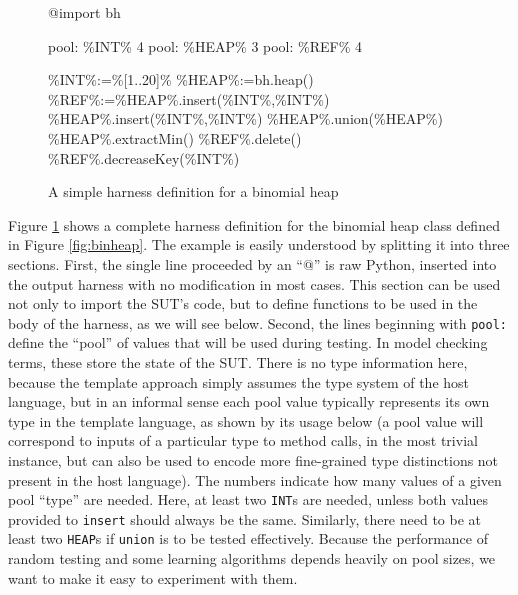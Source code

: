 \documentclass[runningheads,a4paper]{llncs}
\begin{document}
\begin{figure}[t]
{\scriptsize
\begin{code}
@import bh

pool: \%INT\% 4
pool: \%HEAP\% 3
pool: \%REF\% 4

\%INT\%:=\%[1..20]\%
\%HEAP\%:=bh.heap()
\%REF\%:=\%HEAP\%.insert(\%INT\%,\%INT\%)
\%HEAP\%.insert(\%INT\%,\%INT\%)
\%HEAP\%.union(\%HEAP\%)
\%HEAP\%.extractMin()
\%REF\%.delete()
\%REF\%.decreaseKey(\%INT\%)
\end{code}
}
\vspace{-0.1in}
\caption{A simple harness definition for a binomial heap}
\vspace{-0.1in}
\label{fig:binheapharness}
\end{figure}

Figure \ref{fig:binheapharness} shows a complete harness definition
for the binomial heap class defined in Figure \ref{fig:binheap}.  The
example is easily understood by splitting it into three sections.
First, the single line proceeded by an ``@'' is raw Python, inserted
into the output harness with no modification in most cases.  This
section can be used not only to import the SUT's code, but to define
functions to be used in the body of the harness, as we will see below.
Second, the lines beginning with {\tt pool:} define the ``pool''
\cite{Pacheco,UDITA,AndrewsTR} of values that will be used during testing.  In
model checking terms, these store the state of the SUT.  There is no
type information here, because the template approach simply assumes
the type system of the host language, but in an informal sense each
pool value typically represents its own type in the template language,
as shown by its usage below (a pool value will correspond to inputs of
a particular type to method calls, in the most trivial instance, but
can also be used to encode more fine-grained type distinctions not
present in the host language).  The numbers indicate how many values
of a given pool ``type'' are needed.  Here, at least two {\tt INT}s
are needed, unless both values provided to {\tt insert} should always
be the same.  Similarly, there need to be at least two {\tt HEAP}s if
{\tt union} is to be tested effectively.  Because the performance of
random testing and some learning algorithms depends heavily on pool
sizes, we want to make it easy to experiment with them.  
\end{document}
